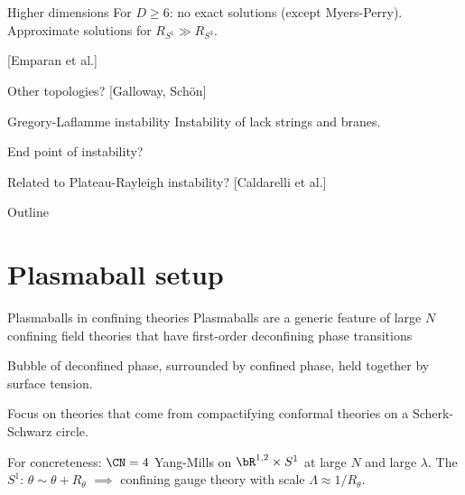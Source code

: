 \documentclass{beamer}
\newcommand{\rref}[1]{\hfill \small{\color{darkgrey} [#1]}}
\begin{document}

\begin{frame}{Higher dimensions}
%
 For $D \geq 6$: no exact solutions (except Myers-Perry). Approximate solutions for $R_{S^1} \gg R_{S^3}$.

 \begin{center}
   
 \end{center}
 \rref{Emparan et al.}

 Other topologies? \rref{Galloway, Sch\"on}
%
\end{frame}


\begin{frame}{Gregory-Laflamme instability}
%
 Instability of lack strings and branes.
 \begin{center}
   
 \end{center}
 End point of instability?

 \vp Related to Plateau-Rayleigh instability? \rref{Caldarelli et al.}
%
\end{frame}


\begin{frame}{Outline}
%
  \tableofcontents
%
\end{frame}


\section{Plasmaball setup}

\begin{frame}{Plasmaballs in confining theories}
%
 Plasmaballs are a generic feature of large $N$ confining field theories that have first-order deconfining phase transitions

 \vp Bubble of deconfined phase, surrounded by confined phase, held together by surface tension.

 \vp Focus on theories that come from compactifying conformal theories on a Scherk-Schwarz circle.

 \vp For concreteness: $\CN=4$ Yang-Mills on $\bR^{1,2}\times S^1$ at large $N$ and large $\lambda$. The $S^1$: $\theta\sim\theta+R_\theta$ $\implies$ confining gauge theory with scale $\Lambda \approx 1/R_\theta$.
%
\end{frame}
\end{document}
